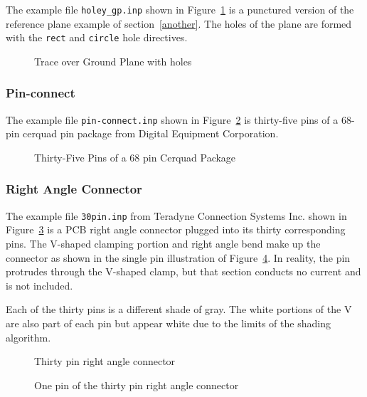The example file {\tt holey\_gp.inp} shown in Figure~\ref{holey}
is a punctured version of the reference plane example of
section~\ref{another}.  The holes of the plane are formed with 
the {\tt rect} and {\tt circle} hole directives. 

\begin{figure}
\centerline{
}
\caption{Trace over Ground Plane with holes}
\label{holey}
\end{figure}

\subsubsection{Pin-connect}

The example file {\tt pin-connect.inp} shown in
Figure~\ref{pin-connect} is thirty-five pins of a 68-pin cerquad pin
package from Digital Equipment Corporation.  

\begin{figure}
\centerline{
}
\caption{Thirty-Five Pins of a 68 pin Cerquad Package}
\label{pin-connect}
\end{figure}

\subsubsection{Right Angle Connector}

The example file {\tt 30pin.inp} from Teradyne Connection Systems
Inc. shown in Figure~\ref{30pin} is a PCB right angle connector
plugged into its thirty corresponding pins.  The V-shaped clamping
portion and right angle bend make up the connector as shown in the
single pin illustration of Figure~\ref{one_of_30pin}.  In reality, the
pin protrudes through the V-shaped clamp, but that section conducts no
current and is not included.

Each of the thirty pins is a different shade of gray.  The
white portions of the V are also part of each pin but appear white due
to the limits of the shading algorithm.


\begin{figure}
\centerline{
}
\caption{Thirty pin right angle connector}
\label{30pin}
\end{figure}

\begin{figure}
\centerline{
}
\caption{One pin of the thirty pin right angle connector}
\label{one_of_30pin}
\end{figure}


